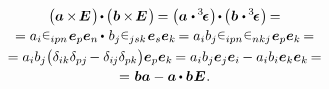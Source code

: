 \vspace{-1.1em}\begin{multline}\label{vectorcrossidentitydotvectorcrossidentity}
\bigl( \bm{a} \hspace{-0.1ex}\times\hspace{-0.25ex} \UnitDyad \hspace{.2ex}\bigr) \hspace{-0.25ex} \dotp \hspace{-0.15ex} \bigl(\hspace{.1ex} \bm{b} \hspace{-0.1ex}\times\hspace{-0.25ex} \UnitDyad \hspace{.2ex}\bigr) \hspace{-0.2ex}
= \bigl( \bm{a} \hspace{.1ex} \dotp \hspace{-0.1ex} \permutationsparitytensor \hspace{.1ex}\bigr) \hspace{-0.25ex} \dotp \hspace{-0.15ex} \bigl(\hspace{.1ex} \bm{b} \hspace{.1ex} \dotp \hspace{-0.1ex} \permutationsparitytensor \hspace{.1ex}\bigr) \hspace{-0.2ex} =
\\[-0.1em]
%
= a_i \permutationsparitysymbols{ipn} \hspace{.1ex} \bm{e}_p \bm{e}_n \hspace{-0.15ex} \dotp \hspace{.2ex} b_j \permutationsparitysymbols{jsk} \hspace{.1ex} \bm{e}_s \bm{e}_k \hspace{-0.2ex}
= a_i b_j \permutationsparitysymbols{ipn} \permutationsparitysymbols{nkj} \hspace{.05ex} \bm{e}_p \bm{e}_k \hspace{-0.2ex} =
\\[-0.1em]
%
= a_i b_j \bigl( \delta_{ik} \delta_{pj} \hspace{-0.22ex} - \delta_{i\hspace{-0.1ex}j} \delta_{pk} \bigr) \bm{e}_p \bm{e}_k \hspace{-0.2ex}
= a_i b_j \bm{e}_j \bm{e}_i \hspace{-0.12ex} - a_i b_i \bm{e}_k \bm{e}_k \hspace{-0.2ex} =
\\[-0.1em]
%
= \hspace{.1ex} \bm{b} \bm{a} - \bm{a} \hspace{-0.1ex} \dotp \bm{b} \hspace{.1ex} \UnitDyad
\hspace{.1ex} .
\end{multline}

